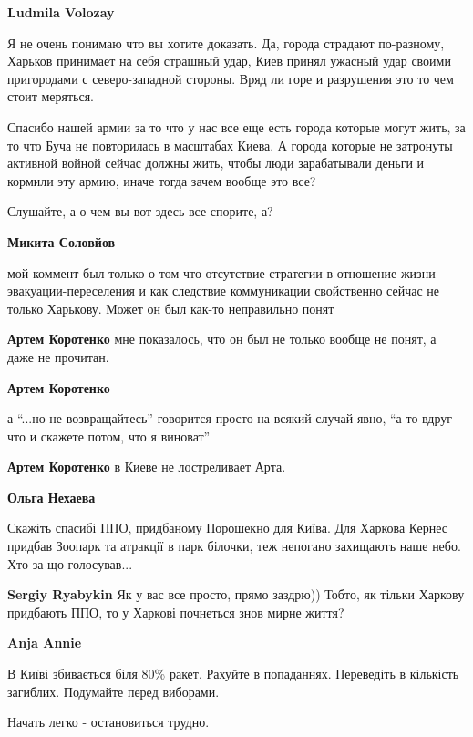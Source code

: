 \begin{itemize}
\begin{itemize}
\textbf{Ludmila Volozay} 

Я не очень понимаю что вы хотите доказать. Да, города страдают по-разному,
Харьков принимает на себя страшный удар, Киев принял ужасный удар своими
пригородами с северо-западной стороны. Вряд ли горе и разрушения это то чем
стоит меряться.

Спасибо нашей армии за то что у нас все еще есть города которые могут жить, за
то что Буча не повторилась в масштабах Киева. А города которые не затронуты
активной войной сейчас должны жить, чтобы люди зарабатывали деньги и кормили
эту армию, иначе тогда зачем вообще это все?

Слушайте, а о чем вы вот здесь все спорите, а?

\textbf{Микита Соловйов} 

мой коммент был только о том что отсутствие стратегии в отношение
жизни-эвакуации-переселения и как следствие коммуникации свойственно сейчас не
только Харькову. Может он был как-то неправильно понят

\textbf{Артем Коротенко} мне показалось, что он был не только вообще не понят, а даже не прочитан.

\textbf{Артем Коротенко} 

а \enquote{...но не возвращайтесь} говорится просто на всякий случай явно, \enquote{а то вдруг что и скажете потом, что я виноват}

\textbf{Артем Коротенко} в Киеве не лостреливает Арта.

\textbf{Ольга Нехаева} 

Скажіть спасибі ППО, придбаному Порошекно для Київа. Для Харкова Кернес придбав
Зоопарк та атракції в парк білочки, теж непогано захищають наше небо. Хто за що
голосував...

\textbf{Sergiy Ryabykin} Як у вас все просто, прямо заздрю)) Тобто, як тільки Харкову придбають ППО, то у Харкові почнеться знов мирне життя?

\textbf{Anja Annie} 

В Київі збивається біля 80\% ракет. Рахуйте в попаданнях. Переведіть в
кількість загиблих. Подумайте перед виборами.

\end{itemize} %


Начать легко - остановиться трудно.


\end{itemize}
